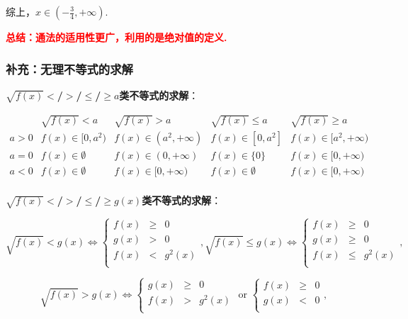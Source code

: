 \documentclass[8pt]{article}
\begin{document}
					综上，$x\in\displaystyle\left(-\frac{3}{4}, +\infty\right).$

					\textcolor{red}{\textbf{总结：通法的适用性更广，利用的是绝对值的定义.}}

			\subsubsection{补充：无理不等式的求解}
				\textbf{$\sqrt{f(x)}$$<$/$>$/$\leq$/$\geq$$a$类不等式的求解}：

				$$
				\begin{array}{ccccc}
					   &\sqrt{f(x)}<a&\sqrt{f(x)}>a&\sqrt{f(x)}\leq a&\sqrt{f(x)}\geq a\\
				    a>0&f(x)\in [0, a^2)&f(x)\in (a^2, +\infty)&f(x)\in [0, a^2]&f(x)\in [a^2, +\infty)\\
				    a=0&f(x)\in\emptyset&f(x)\in (0, +\infty)&f(x)\in\{0\}&f(x)\in[0, +\infty)\\
				    a<0&f(x)\in\emptyset&f(x)\in [0, +\infty)&f(x)\in\emptyset&f(x)\in [0, +\infty)\\
				\end{array}
				$$

				\textbf{$\sqrt{f(x)}$$<$/$>$/$\leq$/$\geq$$g(x)$类不等式的求解}：

				$$
				\sqrt{f(x)}<g(x)
				\Leftrightarrow
				\left\{
				\begin{array}{rcl}
				f(x)&\geq&0\\
				g(x)&>&0\\
				f(x)&<&g^2(x)\\
				\end{array}
				\right.,
				\sqrt{f(x)}\leq g(x)
				\Leftrightarrow
				\left\{
				\begin{array}{rcl}
				f(x)&\geq&0\\
				g(x)&\geq&0\\
				f(x)&\leq&g^2(x)\\
				\end{array}
				\right.,
				$$

				$$
				\sqrt{f(x)}>g(x)
				\Leftrightarrow
				\left\{
				\begin{array}{rcl}
				g(x)&\geq&0\\
				f(x)&>&g^2(x)\\
				\end{array}
				\right.
				\text{ or }
				\left\{
				\begin{array}{rcl}
				f(x)&\geq&0\\
				g(x)&<&0\\
				\end{array}
				\right.,
				$$
\end{document}
